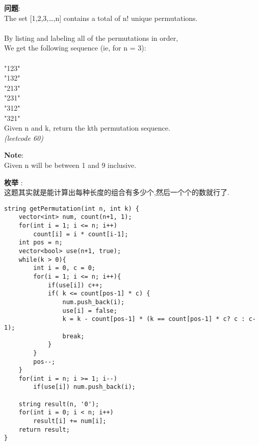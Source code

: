     
\begin{description}
    \item{\textbf{问题}}: \\
The set [1,2,3,…,n] contains a total of n! unique permutations.\\
\\
By listing and labeling all of the permutations in order,\\
We get the following sequence (ie, for n = 3):\\
\\
"123"\\
"132"\\
"213"\\
"231"\\
"312"\\
"321"\\
Given n and k, return the kth permutation sequence.\\
\textit{(leetcode 60)}
	\item{\textbf{Note}}:\\
Given n will be between 1 and 9 inclusive.
    \item{\textbf{枚举}} : 
    \\这题其实就是能计算出每种长度的组合有多少个,然后一个个的数就行了.
    \begin{lstlisting}
string getPermutation(int n, int k) {
	vector<int> num, count(n+1, 1);
	for(int i = 1; i <= n; i++)
		count[i] = i * count[i-1];
	int pos = n;
	vector<bool> use(n+1, true);
	while(k > 0){
		int i = 0, c = 0;
		for(i = 1; i <= n; i++){
			if(use[i]) c++;
			if( k <= count[pos-1] * c) { 
				num.push_back(i);
				use[i] = false;
				k = k - count[pos-1] * (k == count[pos-1] * c? c : c-1);
				break;
			}
		}
		pos--;
	}
	for(int i = n; i >= 1; i--)
		if(use[i]) num.push_back(i);

	string result(n, '0');
	for(int i = 0; i < n; i++)
		result[i] += num[i];
	return result;
}
    \end{lstlisting}
\end{description}
